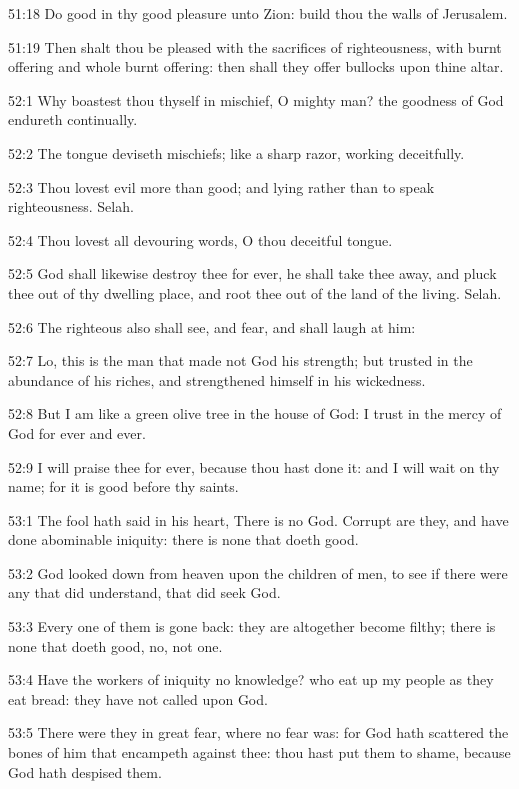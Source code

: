 51:18 Do good in thy good pleasure unto Zion: build thou the walls of Jerusalem.

51:19 Then shalt thou be pleased with the sacrifices of righteousness, with burnt offering and whole burnt offering: then shall they offer bullocks upon thine altar.



52:1 Why boastest thou thyself in mischief, O mighty man? the goodness of God endureth continually.

52:2 The tongue deviseth mischiefs; like a sharp razor, working deceitfully.

52:3 Thou lovest evil more than good; and lying rather than to speak righteousness. Selah.

52:4 Thou lovest all devouring words, O thou deceitful tongue.

52:5 God shall likewise destroy thee for ever, he shall take thee away, and pluck thee out of thy dwelling place, and root thee out of the land of the living. Selah.

52:6 The righteous also shall see, and fear, and shall laugh at him:

52:7 Lo, this is the man that made not God his strength; but trusted in the abundance of his riches, and strengthened himself in his wickedness.

52:8 But I am like a green olive tree in the house of God: I trust in the mercy of God for ever and ever.

52:9 I will praise thee for ever, because thou hast done it: and I will wait on thy name; for it is good before thy saints.



53:1 The fool hath said in his heart, There is no God. Corrupt are they, and have done abominable iniquity: there is none that doeth good.

53:2 God looked down from heaven upon the children of men, to see if there were any that did understand, that did seek God.

53:3 Every one of them is gone back: they are altogether become filthy; there is none that doeth good, no, not one.

53:4 Have the workers of iniquity no knowledge? who eat up my people as they eat bread: they have not called upon God.

53:5 There were they in great fear, where no fear was: for God hath scattered the bones of him that encampeth against thee: thou hast put them to shame, because God hath despised them.

